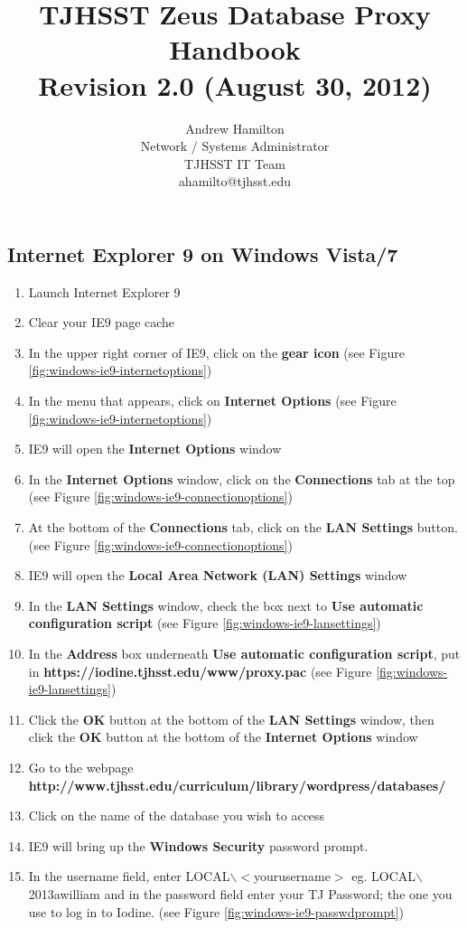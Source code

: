 \documentclass{article}
\author{Andrew Hamilton\\
{\small Network / Systems Administrator}\\
{\small TJHSST IT Team}\\
{\small ahamilto@tjhsst.edu}}
\title{TJHSST Zeus Database Proxy Handbook\\
{\small Revision 2.0 (August 30, 2012)}}
\newcommand{\proxypacurl}{https://iodine.tjhsst.edu/www/proxy.pac}
\newcommand{\librarydbpage}{http://www.tjhsst.edu/curriculum/library/wordpress/databases/}
\begin{document}
\maketitle
\tableofcontents
\begin{flushleft}
\section{Internet Explorer 9 on Windows Vista/7}
\begin{enumerate}
\item Launch Internet Explorer 9
\item Clear your IE9 page cache
\item In the upper right corner of IE9, click on the \textbf{gear icon} (see Figure \ref{fig:windows-ie9-internetoptions})
\item In the menu that appears, click on \textbf{Internet Options} (see Figure \ref{fig:windows-ie9-internetoptions})
\item IE9 will open the \textbf{Internet Options} window
\item In the \textbf{Internet Options} window, click on the \textbf{Connections} tab at the top (see Figure \ref{fig:windows-ie9-connectionoptions})
\item At the bottom of the \textbf{Connections} tab, click on the \textbf{LAN Settings} button. (see Figure \ref{fig:windows-ie9-connectionoptions})
\item IE9 will open the \textbf{Local Area Network (LAN) Settings} window
\item In the \textbf{LAN Settings} window, check the box next to \textbf{Use automatic configuration script} (see Figure \ref{fig:windows-ie9-lansettings})
\item In the \textbf{Address} box underneath \textbf{Use automatic configuration script}, put in \linebreak\textbf{\proxypacurl} (see Figure \ref{fig:windows-ie9-lansettings})
\item Click the \textbf{OK} button at the bottom of the \textbf{LAN Settings} window, then click the \textbf{OK} button at the bottom of the \textbf{Internet Options} window
\item Go to the webpage \textbf{\librarydbpage}
\item Click on the name of the database you wish to access
\item IE9 will bring up the \textbf{Windows Security} password prompt.
\item In the username field, enter LOCAL$\backslash$$<$yourusername$>$ eg. LOCAL$\backslash$2013awilliam and in the password field enter your TJ Password; the one you use to log in to Iodine. (see Figure \ref{fig:windows-ie9-passwdprompt})
$$
\end{enumerate}
\end{flushleft}
\end{document}
